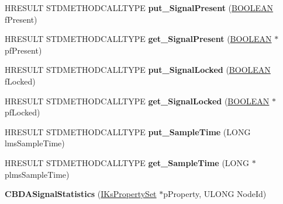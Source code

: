 \begin{DoxyCompactItemize}
\mbox{\label{class_c_b_d_a_signal_statistics_a17d0a5f2bf550ce4321313f8e03339bf}} 
H\+R\+E\+S\+U\+LT S\+T\+D\+M\+E\+T\+H\+O\+D\+C\+A\+L\+L\+T\+Y\+PE {\bfseries put\+\_\+\+Signal\+Present} (\hyperlink{_processor_bind_8h_a112e3146cb38b6ee95e64d85842e380a}{B\+O\+O\+L\+E\+AN} f\+Present)
\item 
\mbox{\label{class_c_b_d_a_signal_statistics_aee5fc4a48cbc456c20708e3dcafcdf61}} 
H\+R\+E\+S\+U\+LT S\+T\+D\+M\+E\+T\+H\+O\+D\+C\+A\+L\+L\+T\+Y\+PE {\bfseries get\+\_\+\+Signal\+Present} (\hyperlink{_processor_bind_8h_a112e3146cb38b6ee95e64d85842e380a}{B\+O\+O\+L\+E\+AN} $\ast$pf\+Present)
\item 
\mbox{\label{class_c_b_d_a_signal_statistics_afc42279f33bee2baebc80c1236c34e09}} 
H\+R\+E\+S\+U\+LT S\+T\+D\+M\+E\+T\+H\+O\+D\+C\+A\+L\+L\+T\+Y\+PE {\bfseries put\+\_\+\+Signal\+Locked} (\hyperlink{_processor_bind_8h_a112e3146cb38b6ee95e64d85842e380a}{B\+O\+O\+L\+E\+AN} f\+Locked)
\item 
\mbox{\label{class_c_b_d_a_signal_statistics_af611c1356a94e8ffd78ee4257ce49294}} 
H\+R\+E\+S\+U\+LT S\+T\+D\+M\+E\+T\+H\+O\+D\+C\+A\+L\+L\+T\+Y\+PE {\bfseries get\+\_\+\+Signal\+Locked} (\hyperlink{_processor_bind_8h_a112e3146cb38b6ee95e64d85842e380a}{B\+O\+O\+L\+E\+AN} $\ast$pf\+Locked)
\item 
\mbox{\label{class_c_b_d_a_signal_statistics_ae078c7742034b0fea4887c102b44a89e}} 
H\+R\+E\+S\+U\+LT S\+T\+D\+M\+E\+T\+H\+O\+D\+C\+A\+L\+L\+T\+Y\+PE {\bfseries put\+\_\+\+Sample\+Time} (L\+O\+NG lms\+Sample\+Time)
\item 
\mbox{\label{class_c_b_d_a_signal_statistics_afa099e13de33b3590b89e0e55702a0f5}} 
H\+R\+E\+S\+U\+LT S\+T\+D\+M\+E\+T\+H\+O\+D\+C\+A\+L\+L\+T\+Y\+PE {\bfseries get\+\_\+\+Sample\+Time} (L\+O\+NG $\ast$plms\+Sample\+Time)
\item 
\mbox{\label{class_c_b_d_a_signal_statistics_a17fba1d19550e92e2392836e4c4dd2cb}} 
{\bfseries C\+B\+D\+A\+Signal\+Statistics} (\hyperlink{interface_i_ks_property_set}{I\+Ks\+Property\+Set} $\ast$p\+Property, U\+L\+O\+NG Node\+Id)
\end{DoxyCompactItemize}
